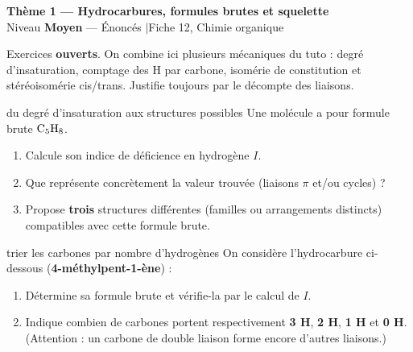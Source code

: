 \documentclass[11pt,a4paper]{article}
\newcommand{\banner}[2]{%
\begin{tcolorbox}[enhanced,colback=primary,colframe=primary,arc=5pt,boxrule=0pt,
   left=5mm,right=5mm,top=2.5mm,bottom=2.5mm,coltext=white]
{\large\bfseries #1}\\[1pt]{\small #2}
\end{tcolorbox}\vspace{2pt}}
\begin{document}
\banner{Thème 1 — Hydrocarbures, formules brutes et squelette}{Niveau \textbf{Moyen} — Énoncés \quad$\vert$\quad Fiche 12, Chimie organique}

\begin{consigne}
Exercices \textbf{ouverts}. On combine ici plusieurs mécaniques du tuto : degré d'insaturation, comptage des H par carbone, isomérie de constitution et stéréoisomérie cis/trans. Justifie toujours par le décompte des liaisons.
\end{consigne}

\begin{exo}{du degré d'insaturation aux structures possibles}
Une molécule a pour formule brute $\ce{C5H8}$.
\begin{enumerate}[label=\textbf{\alph*)},leftmargin=2em,itemsep=1pt]
  \item Calcule son indice de déficience en hydrogène $I$.
  \item Que représente concrètement la valeur trouvée (liaisons $\pi$ et/ou cycles) ?
  \item Propose \textbf{trois} structures différentes (familles ou arrangements distincts) compatibles avec cette formule brute.
\end{enumerate}
\end{exo}

\begin{exo}{trier les carbones par nombre d'hydrogènes}
On considère l'hydrocarbure ci-dessous (\textbf{4-méthylpent-1-ène}) :
\begin{center}\end{center}
\begin{enumerate}[label=\textbf{\alph*)},leftmargin=2em,itemsep=1pt]
  \item Détermine sa formule brute et vérifie-la par le calcul de $I$.
  \item Indique combien de carbones portent respectivement \textbf{3 H}, \textbf{2 H}, \textbf{1 H} et \textbf{0 H}. (Attention : un carbone de double liaison forme encore d'autres liaisons.)
\end{enumerate}
\end{exo}
\end{document}
